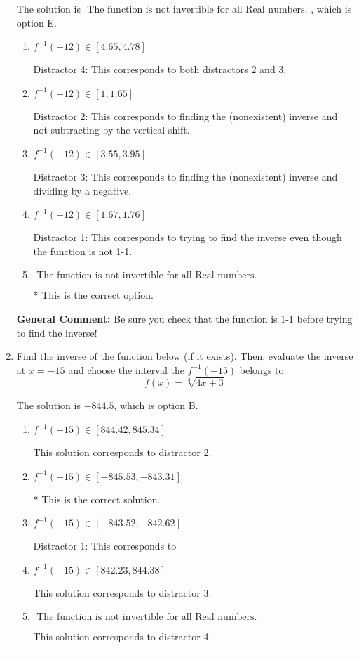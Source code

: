 \documentclass{extbook}[14pt]
\newcommand{\litem}[1]{\item #1

\rule{\textwidth}{0.4pt}}
\begin{document}
\begin{enumerate}
{The solution is \( \text{ The function is not invertible for all Real numbers. } \), which is option E.\begin{enumerate}[label=\Alph*.]
\item \( f^{-1}(-12) \in [4.65, 4.78] \)

 Distractor 4: This corresponds to both distractors 2 and 3.
\item \( f^{-1}(-12) \in [1, 1.65] \)

 Distractor 2: This corresponds to finding the (nonexistent) inverse and not subtracting by the vertical shift.
\item \( f^{-1}(-12) \in [3.55, 3.95] \)

 Distractor 3: This corresponds to finding the (nonexistent) inverse and dividing by a negative.
\item \( f^{-1}(-12) \in [1.67, 1.76] \)

 Distractor 1: This corresponds to trying to find the inverse even though the function is not 1-1. 
\item \( \text{ The function is not invertible for all Real numbers. } \)

* This is the correct option.
\end{enumerate}

\textbf{General Comment:} Be sure you check that the function is 1-1 before trying to find the inverse!
}
\litem{
Find the inverse of the function below (if it exists). Then, evaluate the inverse at $x = -15$ and choose the interval the $f^{-1}(-15)$ belongs to.
\[ f(x) = \sqrt[3]{4 x + 3} \]

The solution is \( -844.5 \), which is option B.\begin{enumerate}[label=\Alph*.]
\item \( f^{-1}(-15) \in [844.42, 845.34] \)

 This solution corresponds to distractor 2.
\item \( f^{-1}(-15) \in [-845.53, -843.31] \)

* This is the correct solution.
\item \( f^{-1}(-15) \in [-843.52, -842.62] \)

 Distractor 1: This corresponds to 
\item \( f^{-1}(-15) \in [842.23, 844.38] \)

 This solution corresponds to distractor 3.
\item \( \text{ The function is not invertible for all Real numbers. } \)

 This solution corresponds to distractor 4.
\end{enumerate}

}
\end{enumerate}
\end{document}
